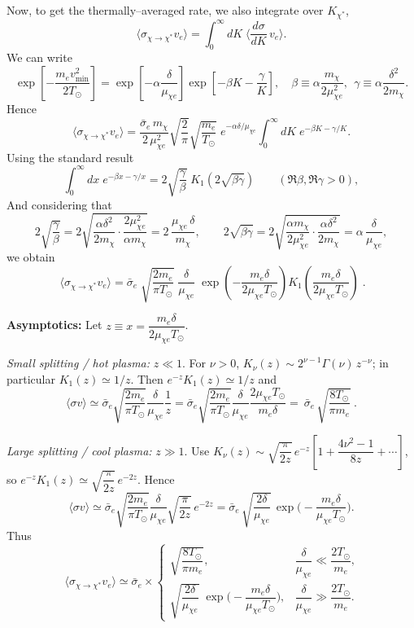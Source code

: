 \documentclass[13.1pt, letterpaper, twoside]{article}
\begin{document}
Now, to get the thermally–averaged rate, we also integrate over $K_{\chi^\ast}$,
\[
\big\langle \sigma_{\chi\to\chi^\ast} v_e \big\rangle
=\int_{0}^{\infty} dK\;
\Big\langle \frac{d\sigma}{dK}\,v_e \Big\rangle .
\]
We can write
\[
\exp\!\left[-\frac{m_e v_{\min}^2}{2T_\odot}\right]
=\exp\!\left[-\alpha\frac{\delta}{\mu_{\chi e}}\right]
\exp\!\left[-\beta K-\frac{\gamma}{K}\right],
\quad
\beta\equiv\alpha\frac{m_\chi}{2\mu_{\chi e}^2},\ \ 
\gamma\equiv\alpha\frac{\delta^2}{2m_\chi}.
\]
Hence
\[
\big\langle \sigma_{\chi\to\chi^\ast} v_e \big\rangle
=\frac{\bar\sigma_e\,m_\chi}{2\,\mu_{\chi e}^2}
\sqrt{\frac{2}{\pi}}\sqrt{\frac{m_e}{T_\odot}}
\;e^{-\alpha\delta/\mu_{\chi e}}
\int_{0}^{\infty} dK\; e^{-\beta K-\gamma/K}.
\]
Using the standard result
\[
\int_{0}^{\infty} dx\; e^{-\beta x-\gamma/x}
=2\sqrt{\frac{\gamma}{\beta}}\;K_{1}\!\left(2\sqrt{\beta\gamma}\right)
\qquad(\Re\beta,\Re\gamma>0),
\]
And considering that
\[
2\sqrt{\frac{\gamma}{\beta}}
=2\sqrt{ \frac{\alpha \delta^2}{2m_\chi}\cdot\frac{2\mu_{\chi e}^2}{\alpha m_\chi} }
=2\,\frac{\mu_{\chi e}\,\delta}{m_\chi},
\qquad
2\sqrt{\beta\gamma}
=2\sqrt{\frac{\alpha m_\chi}{2\mu_{\chi e}^2}\cdot\frac{\alpha\delta^2}{2m_\chi}}
=\alpha\,\frac{\delta}{\mu_{\chi e}},
\]
we obtain
\[
\boxed{\
\big\langle \sigma_{\chi\to\chi^\ast} v_e \big\rangle
=\bar\sigma_e\;
\sqrt{\frac{2m_e}{\pi T_\odot}}\;
\frac{\delta}{\mu_{\chi e}}\;
\exp\!\left(-\frac{m_e\delta}{2\mu_{\chi e}T_\odot}\right)
K_{1}\!\left(\frac{m_e\delta}{2\mu_{\chi e}T_\odot}\right) 
}\; .
\]

\noindent
\textbf{Asymptotics:}
Let $z\equiv x=\dfrac{m_e\delta}{2\mu_{\chi e}T_\odot}$.

\smallskip
\emph{Small splitting / hot plasma:}\; $z\ll1$.
For $\nu>0$, $K_\nu(z)\sim 2^{\nu-1}\Gamma(\nu)\,z^{-\nu}$; in particular
$K_1(z)\simeq 1/z$.
Then $e^{-z}K_1(z)\simeq 1/z$ and
\[
\big\langle \sigma v \big\rangle
\simeq \bar\sigma_e\sqrt{\frac{2m_e}{\pi T_\odot}}
\frac{\delta}{\mu_{\chi e}}\frac{1}{z}
=\bar\sigma_e\sqrt{\frac{2m_e}{\pi T_\odot}}
\frac{\delta}{\mu_{\chi e}}
\frac{2\mu_{\chi e}T_\odot}{m_e\delta}
=\ \bar\sigma_e\,\sqrt{\frac{8T_\odot}{\pi m_e}}\ .
\]

\smallskip
\emph{Large splitting / cool plasma:}\; $z\gg1$.
Use $K_\nu(z)\sim \sqrt{\dfrac{\pi}{2z}}\,e^{-z}\!\left[1+\dfrac{4\nu^2-1}{8z}+\cdots\right]$,
so $e^{-z}K_1(z)\simeq \sqrt{\dfrac{\pi}{2z}}\,e^{-2z}$.
Hence
\[
\big\langle \sigma v \big\rangle
\simeq \bar\sigma_e\sqrt{\frac{2m_e}{\pi T_\odot}}
\frac{\delta}{\mu_{\chi e}}
\sqrt{\frac{\pi}{2z}}\,e^{-2z}
=\bar\sigma_e\,\sqrt{\frac{2\delta}{\mu_{\chi e}}}\,
\exp\!\Big(-\frac{m_e\delta}{\mu_{\chi e}T_\odot}\Big).
\]
Thus
\[
\boxed{\
\big\langle \sigma_{\chi\to\chi^\ast} v_e \big\rangle
\simeq
\bar\sigma_e\!\times\!
\begin{cases}
\displaystyle \sqrt{\dfrac{8T_\odot}{\pi m_e}}, & \dfrac{\delta}{\mu_{\chi e}}\ll \dfrac{2T_\odot}{m_e},\\[10pt]
\displaystyle \sqrt{\dfrac{2\delta}{\mu_{\chi e}}}\;
\exp\!\Big(-\dfrac{m_e\delta}{\mu_{\chi e}T_\odot}\Big), &
\dfrac{\delta}{\mu_{\chi e}}\gg \dfrac{2T_\odot}{m_e}.
\end{cases}
}
\]
\end{document}
